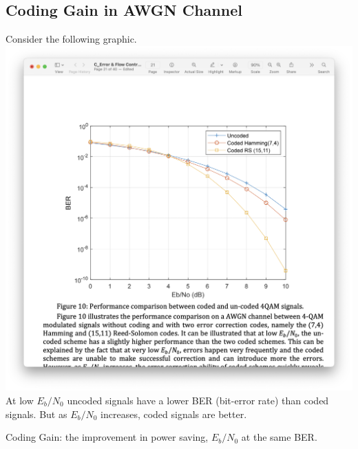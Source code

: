 \documentclass[../../main.tex]{subfiles}
\begin{document}
\subsection{Coding Gain in AWGN Channel}
Consider the following graphic.\\
\includegraphics[width=\textwidth]{images/coding_gain.png}
At low $E_b/N_0$ uncoded signals have a lower BER (bit-error rate) than coded signals. But as $E_b/N_0$ increases, coded signals are better.\\
\begin{definition}
    Coding Gain: the improvement in power saving, $E_b/N_0$ at the same BER.
\end{definition}
\end{document}
